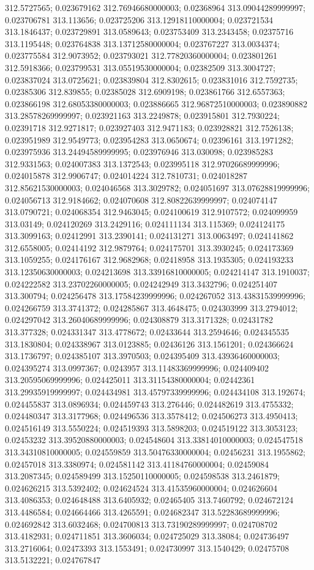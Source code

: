 312.5727565; 0.023679162 312.76946680000003; 0.02368964 313.09044289999997; 0.023706781 313.113656; 0.023725206 313.12918110000004; 0.023721534 313.1846437; 0.023729891 313.0589643; 0.023753409 313.2343458; 0.02375716 313.1195448; 0.023764838 313.13712580000004; 0.023767227 313.0034374; 0.023775584 312.9073952; 0.023793021 312.77820360000004; 0.023801261 312.5918366; 0.023799531 313.05519530000004; 0.02382509 313.3004727; 0.023837024 313.0725621; 0.023839804 312.8302615; 0.023831016 312.7592735; 0.02385306 312.839855; 0.02385028 312.6909198; 0.023861766 312.6557363; 0.023866198 312.68053380000003; 0.023886665 312.96872510000003; 0.023890882 313.28578269999997; 0.023921163 313.2249878; 0.023915801 312.7930224; 0.02391718 312.9271817; 0.023927403 312.9471183; 0.023928821 312.7526138; 0.023951989 312.9549773; 0.023954283 313.0650674; 0.02396161 313.1971282; 0.023975936 313.24494589999995; 0.023976946 313.030098; 0.023985283 312.9331563; 0.024007383 313.1372543; 0.023995118 312.97026689999996; 0.024015878 312.9906747; 0.024014224 312.7810731; 0.024018287 312.85621530000003; 0.024046568 313.3029782; 0.024051697 313.07628819999996; 0.024056713 312.9184662; 0.024070608 312.80822639999997; 0.024074147 313.0790721; 0.024068354 312.9463045; 0.024100619 312.9107572; 0.024099959 313.03149; 0.024120269 313.2429116; 0.024111134 313.115369; 0.024124175 313.3099163; 0.02412991 313.2390141; 0.024131271 313.0063497; 0.024141862 312.6558005; 0.02414192 312.9879764; 0.024175701 313.3930245; 0.024173369 313.1059255; 0.024176167 312.9682968; 0.02418958 313.1935305; 0.024193233 313.12350630000003; 0.024213698 313.33916810000005; 0.024214147 313.1910037; 0.024222582 313.23702260000005; 0.024242949 313.3432796; 0.024251407 313.300794; 0.024256478 313.17584239999996; 0.024267052 313.43831539999996; 0.024266759 313.3741372; 0.024285867 313.4648475; 0.024303999 313.2794012; 0.024297042 313.26040689999996; 0.024308879 313.3171328; 0.02431782 313.377328; 0.024331347 313.4778672; 0.02433644 313.2594646; 0.024345535 313.1830804; 0.024338967 313.0123885; 0.02436126 313.1561201; 0.024366624 313.1736797; 0.024385107 313.3970503; 0.024395409 313.43936460000003; 0.024395274 313.0997367; 0.0243957 313.11483369999996; 0.024409402 313.20595069999996; 0.024425011 313.31154380000004; 0.02442361 313.29935919999997; 0.024434981 313.45797339999996; 0.024434108 313.192674; 0.024455837 313.0896934; 0.024459743 313.276446; 0.024482619 313.4755332; 0.024480347 313.3177968; 0.024496536 313.3578412; 0.024506273 313.4950413; 0.024516149 313.5550224; 0.024519393 313.5898203; 0.024519122 313.3053123; 0.02453232 313.39520880000003; 0.024548604 313.33814010000003; 0.024547518 313.34310810000005; 0.024559859 313.50476330000004; 0.02456231 313.1955862; 0.02457018 313.3380974; 0.024581142 313.41184760000004; 0.02459084 313.2087345; 0.024589499 313.15250110000005; 0.024598538 313.2461879; 0.024626215 313.5392402; 0.024624524 313.41535960000004; 0.024626604 313.4086353; 0.024648488 313.6405932; 0.02465405 313.7460792; 0.024672124 313.4486584; 0.024664466 313.4265591; 0.024682347 313.52283689999996; 0.024692842 313.6032468; 0.024700813 313.73190289999997; 0.024708702 313.4182931; 0.024711851 313.3606034; 0.024725029 313.38084; 0.024736497 313.2716064; 0.02473393 313.1553491; 0.024730997 313.1540429; 0.02475708 313.5132221; 0.024767847 